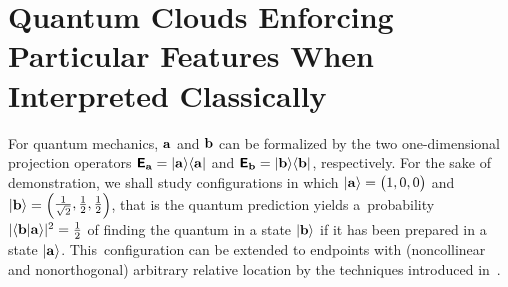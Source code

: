 \section{Quantum Clouds Enforcing Particular Features When Interpreted Classically}

For quantum mechanics, ${\bf a}$ and ${\bf b}$ can be
formalized by the two one-dimensional projection operators
$\textsf{\textbf{E}}_{\bf a} =\vert {\bf a} \rangle \langle {\bf a}\vert$ and
$\textsf{\textbf{E}}_{\bf b} =\vert {\bf b} \rangle \langle {\bf b}\vert$, respectively.
For the sake of demonstration, we shall study configurations in which
$\vert {\bf a} \rangle = \begin{pmatrix}1,0,0\end{pmatrix}$
and
$\vert {\bf b} \rangle = \begin{pmatrix} \frac{1}{\sqrt{2}},\frac{1}{2},\frac{1}{2} \end{pmatrix}$,
that is the quantum prediction yields a~probability $\vert \langle {\bf b} \vert {\bf a} \rangle \vert^2 = \frac{1}{2}$
of finding
the quantum in a state $\vert {\bf b} \rangle$ if it has been prepared in a state $\vert {\bf a}\rangle$.
This~configuration can be extended to endpoints with (noncollinear and nonorthogonal) arbitrary relative location
by the techniques introduced in~\cite{2015-AnalyticKS,Ramanathan-18}.

